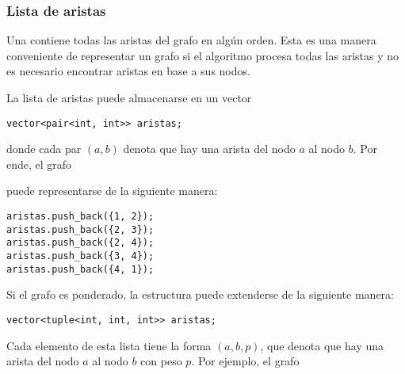 \subsubsection{Lista de aristas}


Una  contiene todas las aristas
del grafo en algún orden. Esta es una manera conveniente
de representar un grafo si el algoritmo procesa todas las aristas
y no es necesario encontrar aristas en base a sus nodos.

La lista de aristas puede almacenarse en un vector
\begin{lstlisting}
vector<pair<int, int>> aristas;
\end{lstlisting}
donde cada par $(a, b)$ denota que hay una arista
del nodo $a$ al nodo $b$. Por ende, el grafo

\begin{center}
\end{center}

puede representarse de la siguiente manera:
\begin{lstlisting}
aristas.push_back({1, 2});
aristas.push_back({2, 3});
aristas.push_back({2, 4});
aristas.push_back({3, 4});
aristas.push_back({4, 1});
\end{lstlisting}

\noindent
Si el grafo es ponderado, la estructura puede
extenderse de la siguiente manera:
\begin{lstlisting}
vector<tuple<int, int, int>> aristas;
\end{lstlisting}

Cada elemento de esta lista tiene la forma $(a,b,p)$,
que denota que hay una arista del nodo $a$ al nodo $b$ con peso $p$.
Por ejemplo, el grafo

